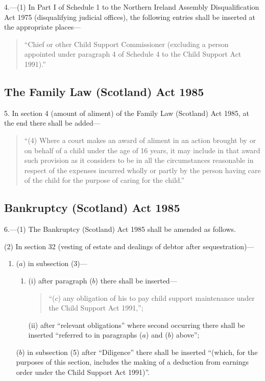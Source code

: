 \documentclass[a4paper]{article}
\begin{document}
4.---(1) In Part I of Schedule 1 to the Northern Ireland Assembly Disqualification Act 1975 (disqualifying judicial offices), the following entries shall be inserted at the appropriate places---
\begin{quotation}
 “Chief or other Child Support Commissioner (excluding a person appointed under paragraph 4 of Schedule 4 to the Child Support Act 1991).''
\end{quotation}


\subsection*{The Family Law (Scotland) Act 1985}

5. In section 4 (amount of aliment) of the Family Law (Scotland) Act 1985, at the end there shall be added—
\begin{quotation}
“(4) Where a court makes an award of aliment in an action brought by or on behalf of a child under the age of 16 years, it may include in that award such provision as it considers to be in all the circumstances reasonable in respect of the expenses incurred wholly or partly by the person having care of the child for the purpose of caring for the child.”
\end{quotation}

\subsection*{Bankruptcy (Scotland) Act 1985}

6.---(1) The Bankruptcy (Scotland) Act 1985 shall be amended as follows.

\begin{sloppypar}
(2) In section 32 (vesting of estate and dealings of debtor after se\-ques\-tra\-tion)---
\end{sloppypar}
\begin{enumerate}\item[]
($a$) in subsection (3)---
\begin{enumerate}\item[]
(i) after paragraph ($b$) there shall be inserted—
\begin{quotation}
“($c$) any obligation of his to pay child support maintenance under the Child Support Act 1991,”;
\end{quotation}

(ii) after “relevant obligations” where second occurring there shall be inserted “referred to in paragraphs ($a$) and ($b$) above”;
\end{enumerate}

($b$) in subsection (5) after “Diligence” there shall be inserted “(which, for the purposes of this section, includes the making of a deduction from earnings order under the Child Support Act 1991)”.
\end{enumerate}
\end{document}
